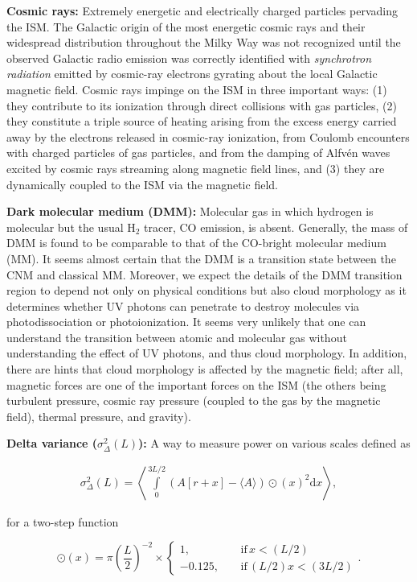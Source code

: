 \documentclass[a4paper,10pt]{article}
\begin{document}
{\noindent}\textbf{Cosmic rays:} Extremely energetic and electrically charged particles pervading the ISM. The Galactic origin of the most energetic cosmic rays and their widespread distribution throughout the Milky Way was not recognized until the observed Galactic radio emission was correctly identified with \textit{synchrotron radiation} emitted by cosmic-ray electrons gyrating about the local Galactic magnetic field. Cosmic rays impinge on the ISM in three important ways: (1) they contribute to its ionization through direct collisions with gas particles, (2) they constitute a triple source of heating arising from the excess energy carried away by the electrons released in cosmic-ray ionization, from Coulomb encounters with charged particles of gas particles, and from the damping of Alfv\'en waves excited by cosmic rays streaming along magnetic field lines, and (3) they are dynamically coupled to the ISM via the magnetic field.

{\noindent}\textbf{Dark molecular medium (DMM):} Molecular gas in which hydrogen is molecular but the usual H$_2$ tracer, CO emission, is absent. Generally, the mass of DMM is found to be comparable to that of the CO-bright molecular medium (MM). It seems almost certain that the DMM is a transition state between the CNM and classical MM. Moreover, we expect the details of the DMM transition region to depend not only on physical conditions but also cloud morphology as it determines whether UV photons can penetrate to destroy molecules via photodissociation or photoionization. It seems very unlikely that one can understand the transition between atomic and molecular gas without understanding the effect of UV photons, and thus cloud morphology. In addition, there are hints that cloud morphology is affected by the magnetic field; after all, magnetic forces are one of the important forces on the ISM (the others being turbulent pressure, cosmic ray pressure (coupled to the gas by the magnetic field), thermal pressure, and gravity).

{\noindent}\textbf{Delta variance ($\sigma_\Delta^2(L)$):} A way to measure power on various scales defined as

\begin{align*}
    \sigma_\Delta^2(L) = \left\langle \int\limits_0^{3L/2} {(A[r+x]-\langle A\rangle)\odot(x)}^2\mathrm{d}x \right\rangle,
\end{align*}

{\noindent}for a two-step function

\begin{equation*}
\odot(x) = \pi\left(\frac{L}{2}\right)^{-2} \times
\left\{
\begin{aligned}
1,          ~~~~~& \mathrm{if}\,x<(L/2) \\
-0.125, ~~~~~& \mathrm{if}\,(L/2)x<(3L/2)
\end{aligned}
\right.
.
\end{equation*}
\end{document}
